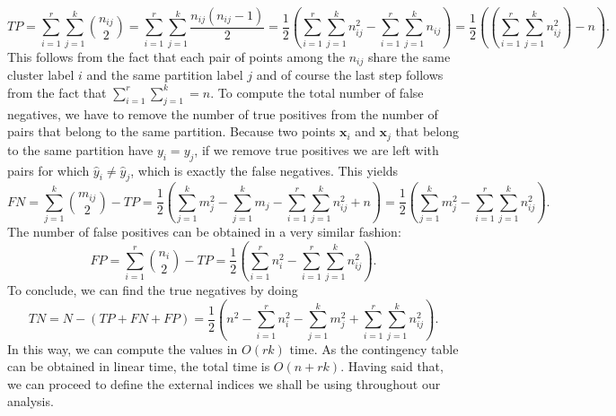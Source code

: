 \documentclass[a4paper]{article}
\begin{document}
		\begin{equation*}
		TP = \sum_{i=1}^{r} \sum_{j=1}^{k} {{n_{ij}}\choose{2}} = \sum_{i=1}^{r} \sum_{j=1}^{k} \frac{n_{ij}\left(n_{ij} - 1\right)}{2}  = \frac{1}{2} \left( \sum_{i=1}^{r} \sum_{j=1}^{k} n_{ij}^{2} - \sum_{i=1}^{r} \sum_{j=1}^{k} n_{ij} \right) = \frac{1}{2} \left( \left( \sum_{i=1}^{r} \sum_{j=1}^{k} n_{ij}^{2} \right) - n \right).
		\end{equation*}
		This follows from the fact that each pair of points among the $n_{ij}$ share the same cluster label $i$ and the same partition label $j$ and of course the last step follows from the fact that $\sum_{i=1}^{r} \sum_{j=1}^{k} = n$.
		To compute the total number of false negatives, we have to remove the number of true positives from the number of pairs that belong to the same partition. Because two points $\boldsymbol{x}_{i}$ and $\boldsymbol{x}_{j}$ that belong to the same partition have $y_{i} = y_{j}$, if we remove true positives we are left with pairs for which $\hat{y}_{i} \neq \hat{y}_{j}$, which is exactly the false negatives.
		This yields
		\begin{equation*}
		FN = \sum_{j=1}^{k} {{m_{ij}}\choose{2}} - TP = \frac{1}{2} \left( \sum_{j=1}^{k} m_{j}^{2} - \sum_{j=1}^{k} m_{j} - \sum_{i=1}^{r}\sum_{j=1}^{k} n_{ij}^{2} + n \right) = \frac{1}{2} \left( \sum_{j=1}^{k} m_{j}^{2} - \sum_{i=1}^{r} \sum_{j=1}^{k} n_{ij}^{2} \right).
		\end{equation*}
		The number of false positives can be obtained in a very similar fashion:
		\begin{equation*}
		FP = \sum_{i=1}^{r} {n_{i}\choose{2}} - TP = \frac{1}{2}\left( \sum_{i=1}^{r} n_{i}^{2} - \sum_{i=1}^{r} \sum_{j=1}^{k} n_{ij}^{2} \right).
		\end{equation*}
		To conclude, we can find the true negatives by doing
		\begin{equation*}
		TN = N - \left( TP + FN + FP \right) = \frac{1}{2} \left( n^{2} - \sum_{i=1}^{r} n_{i}^{2} - \sum_{j=1}^{k} m_{j}^{2} + \sum_{i=1}^{r} \sum_{j=1}^{k} n_{ij}^{2} \right).
		\end{equation*}
		In this way, we can compute the values in $O\left(rk\right)$ time. As the contingency table can be obtained in linear time, the total time is $O\left(n + rk\right)$.
		Having said that, we can proceed to define the external indices we shall be using throughout our analysis.
\end{document}
